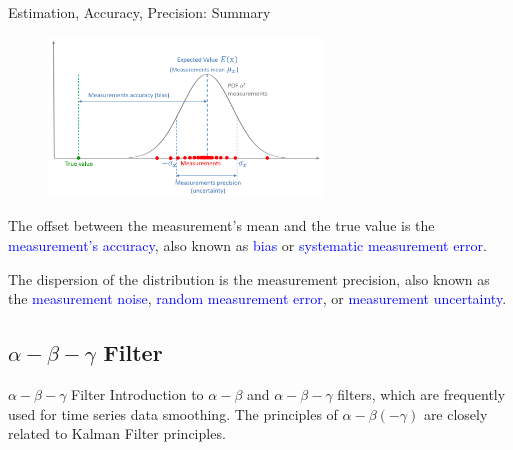 \begin{frame}{Estimation, Accuracy, Precision: Summary}
            \begin{figure}
		       \centering
		        \includegraphics[width=0.65\textwidth]{Figures/Chapter1/statistical_view.png}
		        \label{fig:statistical_view}
	        \end{figure}
    
    The offset between the measurement's mean and the true value is the \textcolor{blue}{measurement's accuracy}, also known as \textcolor{blue}{bias} or \textcolor{blue}{systematic measurement error}.
    
    \vspace{5pt}
    The dispersion of the distribution is the measurement precision, also known as the \textcolor{blue}{measurement noise}, \textcolor{blue}{random measurement error}, or \textcolor{blue}{measurement uncertainty}.
\end{frame}
\subsection{$\alpha-\beta-\gamma$ Filter}

\begin{frame}{$\alpha-\beta-\gamma$ Filter}
Introduction to $\alpha - \beta$ and $\alpha - \beta - \gamma$ filters, which are frequently used for time series data smoothing. The principles of $\alpha - \beta (- \gamma)$ are closely related to Kalman Filter principles.

\end{frame}


